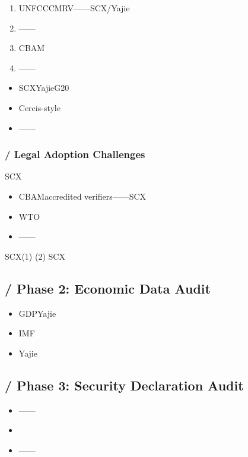 \documentclass[12pt,a4paper]{article}
\theoremstyle{remark}
\begin{document}
\begin{enumerate}[label=(\arabic*)]
    \item \textbf{}UNFCCCMRV——SCX/Yajie
    \item \textbf{}——
    \item \textbf{}CBAM
    \item \textbf{}——
\end{enumerate}


\begin{itemize}[nosep]
    \item SCXYajieG20
    \item Cercis-style
    \item ——
\end{itemize}

\subsubsection{ / Legal Adoption Challenges}

SCX
\begin{itemize}[nosep]
    \item CBAMaccredited verifiers——SCX
    \item WTO
    \item ——
\end{itemize}

SCX(1) \textbf{}(2) \textbf{}SCX

\subsection{ / Phase 2: Economic Data Audit}



\begin{itemize}[nosep]
    \item GDPYajie
    \item IMF
    \item Yajie
\end{itemize}

\subsection{ / Phase 3: Security Declaration Audit}



\begin{itemize}[nosep]
    \item ——\textbf{}
    \item 
    \item ——\textbf{}
\end{itemize}
\end{document}
